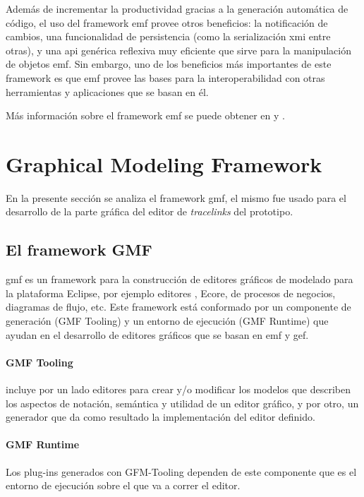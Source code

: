 \documentclass[a4paper,12pt,oneside,spanish]{book}
\begin{document}
Además de incrementar la productividad gracias a la generación automática de código, el uso del framework \gls{emf} provee otros beneficios: la notificación de cambios, una funcionalidad de persistencia (como la serialización \gls{xmi} entre otras), y una \gls{api} genérica reflexiva muy eficiente que sirve para la manipulación de objetos \gls{emf}. Sin embargo, uno de los beneficios más importantes de este framework es que \gls{emf} provee las bases para la interoperabilidad con otras herramientas y aplicaciones que se basan en él. 

Más información sobre el framework \gls{emf} se puede obtener en \cite{EMF} y \cite{EMFADG}.


\section{Graphical Modeling Framework}
\label{sec:GMF}

En la presente sección se analiza el framework \gls{gmf}, el mismo fue usado para el desarrollo de la parte gráfica del editor de \textit{tracelinks} del prototipo.

\subsection{El framework GMF}

\gls{gmf} es un framework para la construcción de editores gráficos de modelado para la plataforma \textsf{Eclipse}, por ejemplo editores , \textsf{Ecore}, de procesos de negocios, diagramas de flujo, etc. Este framework está conformado por un componente de generación (\textsf{GMF Tooling}) y un entorno de ejecución (\textsf{GMF Runtime}) que ayudan en el desarrollo de editores gráficos que se basan en \gls{emf} y \gls{gef}.

\paragraph{GMF Tooling} incluye por un lado editores para crear y/o modificar los modelos que describen los aspectos de notación, semántica y utilidad de un editor gráfico, y por otro, un generador que da como resultado la implementación del editor definido.

\paragraph{GMF Runtime} Los plug-ins generados con \textsf{GFM-Tooling} dependen de este componente que es el entorno de ejecución sobre el que va a correr el editor.
\end{document}
